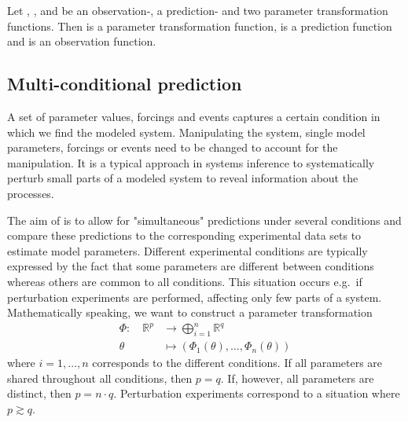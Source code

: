 \documentclass[article]{jss}
\begin{document}
Let , ,  and  be an observation-, a prediction- and two parameter transformation functions. Then  is a parameter transformation function,  is a prediction function and  is an observation function.

\subsection{Multi-conditional prediction}

A set of parameter values, forcings and events captures a certain condition in which we find the modeled system. Manipulating the system, single model parameters, forcings or events need to be changed to account for the manipulation. It is a typical approach in systems inference to systematically perturb small parts of a modeled system to reveal information about the processes.

The aim of  is to allow for "simultaneous" predictions under several conditions and compare these predictions to the corresponding experimental data sets to estimate model parameters.
Different experimental conditions are typically expressed by the fact that some parameters are different between conditions whereas others are common to all conditions. This situation occurs e.g.~if perturbation experiments are performed, affecting only few parts of a system.
Mathematically speaking, we want to construct a parameter transformation
\begin{equation}
	\begin{aligned}
		\Phi:\quad \mathbb R^p & \longrightarrow  \bigoplus_{i = 1}^n \mathbb R^q \\
		\theta & \longmapsto  \left(\Phi_1(\theta), \dots, \Phi_n(\theta)\right)
	\end{aligned}
	\label{eq:partrafo}
\end{equation}
where $i = 1, \dots, n$ corresponds to the different conditions. If all parameters are shared throughout all conditions, then $p = q$. If, however, all parameters are distinct, then $p = n\cdot q$. Perturbation experiments correspond to a situation where $p\gtrsim q$.
\end{document}
